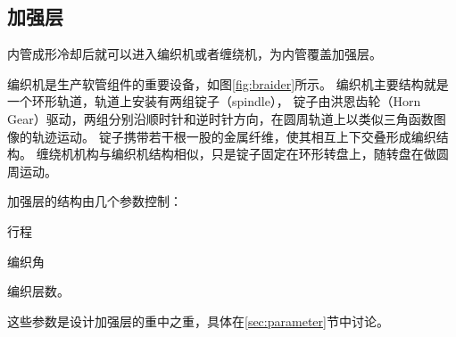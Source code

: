 \subsection{加强层}

内管成形冷却后就可以进入编织机或者缠绕机，为内管覆盖加强层。

编织机是生产软管组件的重要设备，如图\ref{fig:braider}所示。
编织机主要结构就是一个环形轨道，轨道上安装有两组锭子（spindle），
锭子由洪恩齿轮（Horn Gear）驱动，两组分别沿顺时针和逆时针方向，在圆周轨道上以类似三角函数图像的轨迹运动。
锭子携带若干根一股的金属纤维，使其相互上下交叠形成编织结构。
缠绕机机构与编织机结构相似，只是锭子固定在环形转盘上，随转盘在做圆周运动。

加强层的结构由几个参数控制：
\begin{inparaenum}[1).]
	\item 行程
	\item 编织角
	\item 编织层数。
\end{inparaenum}
这些参数是设计加强层的重中之重，具体在\ref{sec:parameter}节中讨论。


